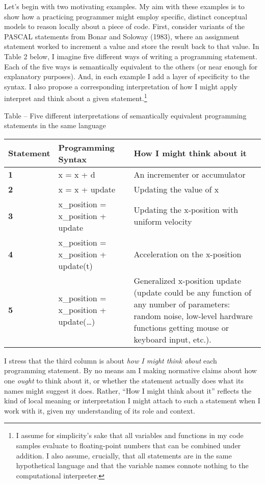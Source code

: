Let's begin with two motivating examples. My aim with these examples is
to show how a practicing programmer might employ specific, distinct
conceptual models to reason locally about a piece of code. First,
consider variants of the PASCAL statements from Bonar and Soloway
(1983), where an assignment statement worked to increment a value and
store the result back to that value. In Table 2 below, I imagine five
different ways of writing a programming statement. Each of the five ways
is semantically equivalent to the others (or near enough for explanatory
purposes). And, in each example I add a layer of specificity to the
syntax. I also propose a corresponding interpretation of how I might
apply interpret and think about a given statement.\footnote{I assume for
  simplicity's sake that all variables and functions in my code samples
  evaluate to floating-point numbers that can be combined under
  addition. I also assume, crucially, that all statements are in the
  same hypothetical language and that the variable names connote nothing
  to the computational interpreter.}

\protect\hypertarget{ux5fToc252445956}{}{}Table -- Five different
interpretations of semantically equivalent programming statements in the
same language

\begin{longtable}[]{@{}lll@{}}
\toprule
\textbf{Statement } & Programming Syntax & How I might think about
it\tabularnewline
\midrule
\endhead
\textbf{1} & x = x + d & An incrementer or accumulator\tabularnewline
\textbf{2} & x = x + update & Updating the value of x\tabularnewline
\textbf{3} & x\_position = x\_position + update & Updating the
x-position with uniform velocity\tabularnewline
\textbf{4} & x\_position = x\_position + update(t) & Acceleration on the
x-position\tabularnewline
\textbf{5} & x\_position = x\_position + update(\ldots{}) & Generalized
x-position update (update could be any function of any number of
parameters: random noise, low-level hardware functions getting mouse or
keyboard input, etc.).\tabularnewline
\bottomrule
\end{longtable}

I stress that the third column is about \emph{how I might think about}
each programming statement\emph{.} By no means am I making normative
claims about how one \emph{ought} to think about it, or whether the
statement actually does what its names might suggest it does. Rather,
``How I might think about it'' reflects the kind of local meaning or
interpretation I might attach to such a statement when I work with it,
given my understanding of its role and context.

